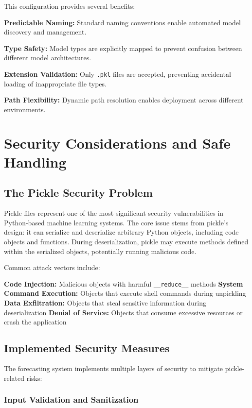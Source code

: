 This configuration provides several benefits:

\textbf{Predictable Naming:} Standard naming conventions enable automated model discovery and management.

\textbf{Type Safety:} Model types are explicitly mapped to prevent confusion between different model architectures.

\textbf{Extension Validation:} Only \texttt{.pkl} files are accepted, preventing accidental loading of inappropriate file types.

\textbf{Path Flexibility:} Dynamic path resolution enables deployment across different environments.

\section{Security Considerations and Safe Handling}

\subsection{The Pickle Security Problem}

Pickle files represent one of the most significant security vulnerabilities in Python-based machine learning systems. The core issue stems from pickle's design: it can serialize and deserialize arbitrary Python objects, including code objects and functions. During deserialization, pickle may execute methods defined within the serialized objects, potentially running malicious code.

Common attack vectors include:

\textbf{Code Injection:} Malicious objects with harmful \texttt{\_\_reduce\_\_} methods
\textbf{System Command Execution:} Objects that execute shell commands during unpickling
\textbf{Data Exfiltration:} Objects that steal sensitive information during deserialization
\textbf{Denial of Service:} Objects that consume excessive resources or crash the application

\subsection{Implemented Security Measures}

The forecasting system implements multiple layers of security to mitigate pickle-related risks:

\subsubsection{Input Validation and Sanitization}

